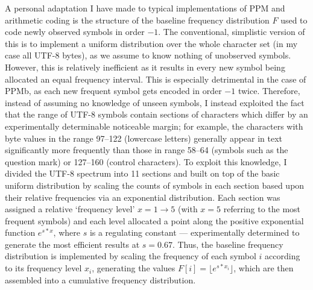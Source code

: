 \documentclass[a4paper, 11pt]{article}
\begin{document}
A personal adaptation I have made to typical implementations of PPM and arithmetic coding is the structure of the baseline frequency distribution $F$ used to code newly observed symbols in order $-1$. The conventional, simplistic version of this is to implement a uniform distribution over the whole character set (in my case all UTF-8 bytes), as we assume to know nothing of unobserved symbols. However, this is relatively inefficient as it results in every new symbol being allocated an equal frequency interval. This is especially detrimental in the case of PPMb, as each new frequent symbol gets encoded in order $-1$ twice. Therefore, instead of assuming no knowledge of unseen symbols, I instead exploited the fact that the range of UTF-8 symbols contain sections of characters which differ by an experimentally determinable noticeable margin; for example, the characters with byte values in the range 97--122 (lowercase letters) generally appear in text significantly more frequently than those in range 58--64 (symbols such as the question mark) or 127--160 (control characters). To exploit this knowledge, I divided the UTF-8 spectrum into 11 sections and built on top of the basic uniform distribution by scaling the counts of symbols in each section based upon their relative frequencies via an exponential distribution. Each section was assigned a relative ‘frequency level’ $x = 1 \to 5$ (with $x=5$ referring to the most frequent symbols) and each level allocated a point along the positive exponential function $e^{s * x}$, where $s$ is a regulating constant --- experimentally determined to generate the most efficient results at $s = 0.67$. Thus, the baseline frequency distribution is implemented by scaling the frequency of each symbol $i$ according to its frequency level $x_{i}$, generating the values $F[i] = \lfloor e^{s * x_{i}} \rfloor$, which are then assembled into a cumulative frequency distribution.
\end{document}
